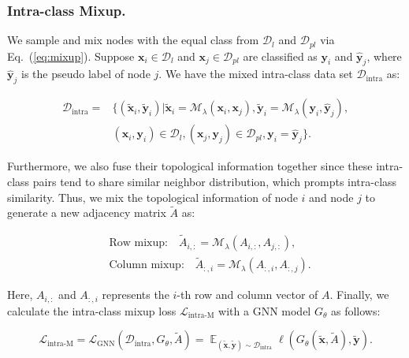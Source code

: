\documentclass[letterpaper]{article} %
\newcommand{\labeledset}{\mathcal{D}_{l}}
\newcommand{\aVec}[1]{\mathbf{#1}}
\newcommand{\intraset}{\mathcal{D}_{\text{intra}}}
\DeclareMathOperator*{\expectation}{\mathbb{E}}
\begin{document}
\subsubsection{Intra-class Mixup.}
 We sample and mix nodes with the equal class from $\labeledset$ and $\mathcal{D}_{pl}$ via Eq.~(\ref{eq:mixup}). Suppose $\aVec{x}_{i} \in \labeledset$ and $\aVec{x}_{j} \in \mathcal{D}_{pl}$ are classified as $\aVec{y}_{i}$ and $\hat{\aVec{y}}_{j}$, where $\hat{\aVec{y}}_{j}$ is the pseudo label of node $j$. We have the mixed intra-class data set $\intraset$ as:
 \begin{small}
 	\begin{equation}
 	\label{D-intra}
 	\begin{split}
 	\intraset = &\{(\tilde{\aVec{x}}_{i}, \tilde{\aVec{y}}_{i} )|\tilde{\aVec{x}}_{i} = \mathcal{M}_{\lambda}(\aVec{x}_{i}, \aVec{x}_{j}),  \tilde{\aVec{y}}_{i} = \mathcal{M}_{\lambda}(\aVec{y}_{i}, \hat{\aVec{y}}_{j}), \\
 				&(\aVec{x}_{i}, \aVec{y}_{i}) \in \labeledset, (\aVec{x}_{j}, \aVec{y}_{j}) \in \mathcal{D}_{pl}, \aVec{y}_{i} = \hat{\aVec{y}}_{j}\}.
 	\end{split}
 	\end{equation}
 \end{small}
Furthermore, we also fuse their topological information together since these intra-class pairs tend to share similar neighbor distribution, which prompts intra-class similarity. Thus, we mix the topological information of node $i$ and node $j$ to generate a new adjacency matrix $\tilde{A}$ as: 
\begin{small}
	\begin{equation}
	\begin{split}
		&\text{Row mixup:}\quad\tilde{A}_{i, :} = \mathcal{M}_{\lambda}(A_{i, :}, A_{j, :}),\\
		&\text{Column mixup:}\quad\tilde{A}_{:, i} = \mathcal{M}_{\lambda}(A_{:, i}, A_{:, j}).
	\end{split}
	\end{equation}
\end{small}
Here, $A_{i, :}$ and $A_{:, i}$ represents the $i$-th row and column vector of $A$. Finally, we calculate the intra-class mixup loss $\mathcal{L}_{\text{intra-M}}$ with a GNN model $G_{\theta}$ as follows:
\begin{small}
	\begin{equation}
	\label{loss-intra-mixup}
		\mathcal{L}_{\text{intra-M}} = \mathcal{L}_{\text{GNN}} (\intraset, G_{\theta}, \tilde{A}) = \expectation_{(\tilde{\aVec{x}}, \tilde{\aVec{y}}) \sim \intraset} \ell(G_{\theta}(\tilde{\aVec{x}}, \tilde{A}), \tilde{\aVec{y}}).
	\end{equation}
\end{small}
\end{document}
